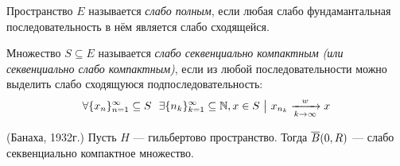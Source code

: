 \begin{definition}
	Пространство $E$ называется \textit{слабо полным}, если любая слабо фундамантальная последовательность в нём является слабо сходящейся.
\end{definition}

\begin{definition}
	Множество $S \subseteq E$ называется \textit{слабо секвенциально компактным (или секвенциально слабо компактным)}, если из любой последовательности можно выделить слабо сходящуюся подпоследовательность:
	\[
		\forall \{x_n\}_{n = 1}^\infty \subseteq S\ \ \exists \{n_k\}_{k = 1}^\infty \subseteq \mathbb{N}, x \in S \ \big|\  x_{n_k} \xrightarrow[k \to \infty]{w} x
	\]
\end{definition}

\begin{theorem} (Банаха, 1932г.)
	Пусть $H$ --- гильбертово пространство. Тогда $\overline{B}(0, R)$ --- слабо секвенциально компактное множество.
\end{theorem}

